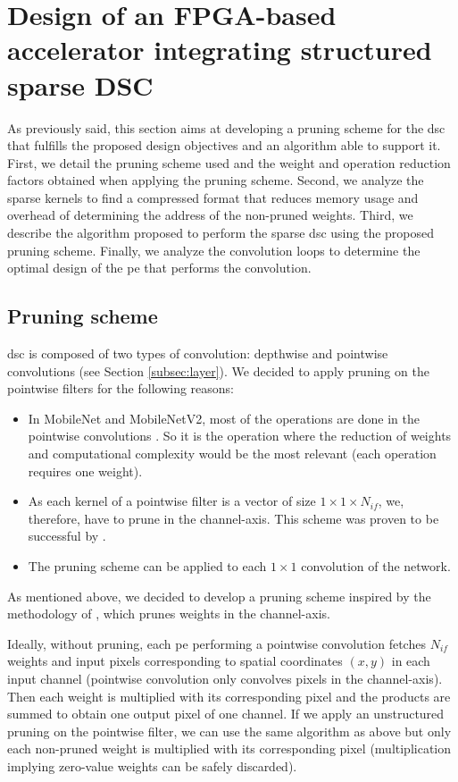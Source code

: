 \section{Design of an FPGA-based accelerator integrating structured sparse DSC} \label{sec:design}
%
As previously said, this section aims at developing a pruning scheme for the \acrshort{dsc} that fulfills the proposed design objectives and an algorithm able to support it. First, we detail the pruning scheme used and the weight and operation reduction factors obtained when applying the pruning scheme. Second, we analyze the sparse kernels to find a compressed format that reduces memory usage and overhead of determining the address of the non-pruned weights. Third, we describe the algorithm proposed to perform the sparse \acrshort{dsc} using the proposed pruning scheme. Finally, we analyze the convolution loops to determine the optimal design of the \acrshort{pe} that performs the convolution.
%
\subsection{Pruning scheme} \label{subsec:pscheme}
%
\acrshort{dsc} is composed of two types of convolution: depthwise and pointwise convolutions (see Section \ref{subsec:layer}). We decided to apply pruning on the pointwise filters for the following reasons:
%
\begin{itemize}
    \item In MobileNet and MobileNetV2, most of the operations are done in the pointwise convolutions \cite{zhang_channel_2019, tu_pruning_2019}. So it is the operation where the reduction of weights and computational complexity would be the most relevant (each operation requires one weight).
    \item As each kernel of a pointwise filter is a vector of size $1 \times 1  \times N_{if}$, we, therefore, have to prune in the channel-axis. This scheme was proven to be successful by \textcite{kang_accelerator-aware_2020}.
    \item The pruning scheme can be applied to each $1 \times 1$ convolution of the network.
\end{itemize}
%
As mentioned above, we decided to develop a pruning scheme inspired by the methodology of \textcite{kang_accelerator-aware_2020}, which prunes weights in the channel-axis.

Ideally, without pruning, each \acrshort{pe} performing a pointwise convolution fetches $N_{if}$ weights and input pixels corresponding to spatial coordinates $(x, y)$ in each input channel (pointwise convolution only convolves pixels in the channel-axis). Then each weight is multiplied with its corresponding pixel and the products are summed to obtain one output pixel of one channel. If we apply an unstructured pruning on the pointwise filter, we can use the same algorithm as above but only each non-pruned weight is multiplied with its corresponding pixel (multiplication implying zero-value weights can be safely discarded).

